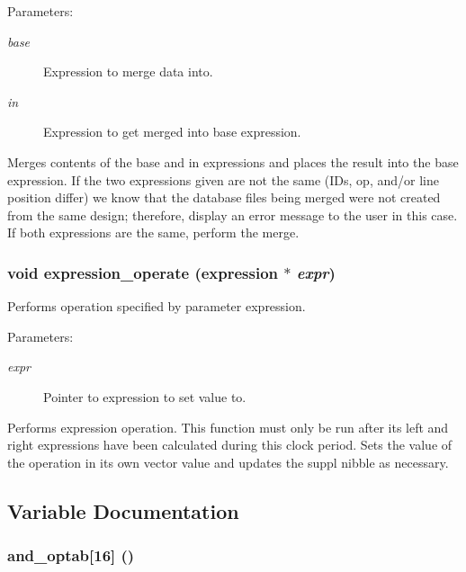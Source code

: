 \begin{Desc}
\item[Parameters: ]\par
\begin{description}
\item[{\em 
base}]Expression to merge data into. \item[{\em 
in}]Expression to get merged into base expression.\end{description}
\end{Desc}
Merges contents of the base and in expressions and places the result into the base expression. If the two expressions given are not the same (IDs, op, and/or line position differ) we know that the database files being merged  were not created from the same design; therefore, display an error message  to the user in this case. If both expressions are the same, perform the  merge. 
\subsubsection{\setlength{\rightskip}{0pt plus 5cm}void expression\_\-operate ({\bf expression} $\ast$ {\em expr})}\label{expr_8c_a13}


Performs operation specified by parameter expression.

\begin{Desc}
\item[Parameters: ]\par
\begin{description}
\item[{\em 
expr}]Pointer to expression to set value to.\end{description}
\end{Desc}
Performs expression operation. This function must only be run after its left and right expressions have been calculated during this clock period. Sets the value of the operation in its own vector value and updates the suppl nibble as necessary. 

\subsection{Variable Documentation}
\subsubsection{ and\_\-optab[16] ()}\label{expr_8c_a1}


